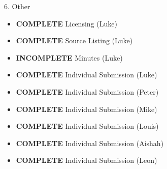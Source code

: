 6. Other
\begin{itemize}
\item \textbf{COMPLETE}   Licensing (Luke)
\item \textbf{COMPLETE}   Source Listing (Luke)
\item \textbf{INCOMPLETE} Minutes (Luke)
\item \textbf{COMPLETE}   Individual Submission (Luke)
\item \textbf{COMPLETE}   Individual Submission (Peter)
\item \textbf{COMPLETE}   Individual Submission (Mike)
\item \textbf{COMPLETE}   Individual Submission (Louis)
\item \textbf{COMPLETE}   Individual Submission (Aishah)
\item \textbf{COMPLETE}    Individual Submission (Leon)
\end{itemize}
